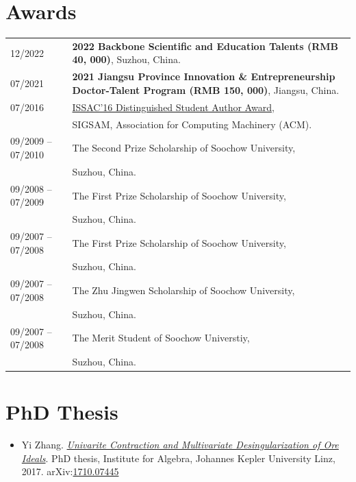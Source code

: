 \documentclass[a4paper,12pt]{article}
\begin{document}
\section*{\Large{Awards}}
\begin{tabular}{@{}p{1.4in}p{4.5in}}
12/2022 &  \textbf{2022 Backbone Scientific and Education Talents (RMB 40, 000)}, Suzhou, China.  \\
07/2021         & \textbf{2021 Jiangsu Province Innovation \& Entrepreneurship Doctor-Talent Program (RMB 150, 000)}, 
                       Jiangsu, China. \\
07/2016               & \href{https://www.sigsam.org/Awards/ISSACAwards.html}{ISSAC'16 Distinguished Student Author Award}, \\
                      & SIGSAM, Association for Computing Machinery (ACM). \\
09/2009 -- 07/2010    & The Second Prize Scholarship of Soochow University, \\ 
                      & Suzhou, China.\\
09/2008 -- 07/2009    & The First Prize Scholarship of Soochow University, \\ 
                      & Suzhou, China.\\
09/2007 -- 07/2008    & The First Prize Scholarship of Soochow University, \\ 
                      & Suzhou, China.\\
09/2007 -- 07/2008    & The Zhu Jingwen Scholarship of Soochow University, \\ 
                      & Suzhou, China.\\
09/2007 -- 07/2008    & The Merit Student of Soochow Universtiy, \\ 
                      & Suzhou, China.\\
\end{tabular}


\section*{\Large{PhD Thesis}}
\begin{itemize}
 \item Yi Zhang. \href{https://yzhang1616.github.io/yzhang_PhDthesis_final.pdf}{{\em Univarite 
                Contraction and Multivariate Desingularization of Ore Ideals}}. 
                PhD thesis, Institute for Algebra, Johannes Kepler University Linz, 2017. 
                arXiv:\href{https://arxiv.org/abs/1710.07445}{1710.07445}
\end{itemize}
\end{document}
